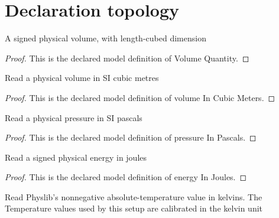 \section{Declaration topology}
\begin{definition}
  \label{def:physics:phyx-mini-0350:phyxminiproblems-problemphyxmini0350-volumequantity}
  A signed physical volume, with length-cubed dimension
\end{definition}
\begin{proof}
  This is the declared model definition of Volume Quantity.
\end{proof}
\begin{definition}
  \label{def:physics:phyx-mini-0350:phyxminiproblems-problemphyxmini0350-volumeincubicmeters}
  Read a physical volume in SI cubic metres
\end{definition}
\begin{proof}
  This is the declared model definition of volume In Cubic Meters.
\end{proof}
\begin{definition}
  \label{def:physics:phyx-mini-0350:phyxminiproblems-problemphyxmini0350-pressureinpascals}
  Read a physical pressure in SI pascals
\end{definition}
\begin{proof}
  This is the declared model definition of pressure In Pascals.
\end{proof}
\begin{definition}
  \label{def:physics:phyx-mini-0350:phyxminiproblems-problemphyxmini0350-energyinjoules}
  Read a signed physical energy in joules
\end{definition}
\begin{proof}
  This is the declared model definition of energy In Joules.
\end{proof}
\begin{definition}
  \label{def:physics:phyx-mini-0350:phyxminiproblems-problemphyxmini0350-temperatureinkelvin}
  Read Physlib's nonnegative absolute-temperature value in kelvins. The Temperature values used by this setup are calibrated in the kelvin unit
\end{definition}
